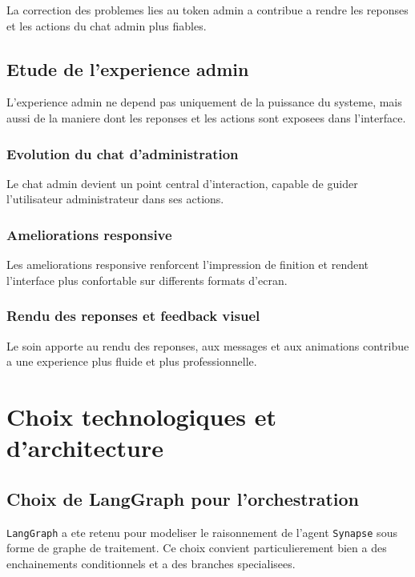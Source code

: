 La correction des problemes lies au token admin a contribue a rendre les reponses et les actions du chat admin plus fiables.

\subsection{Etude de l'experience admin}

L'experience admin ne depend pas uniquement de la puissance du systeme, mais aussi de la maniere dont les reponses et les actions sont exposees dans l'interface.

\subsubsection{Evolution du chat d'administration}

Le chat admin devient un point central d'interaction, capable de guider l'utilisateur administrateur dans ses actions.

\subsubsection{Ameliorations responsive}

Les ameliorations responsive renforcent l'impression de finition et rendent l'interface plus confortable sur differents formats d'ecran.

\subsubsection{Rendu des reponses et feedback visuel}

Le soin apporte au rendu des reponses, aux messages et aux animations contribue a une experience plus fluide et plus professionnelle.

\section{Choix technologiques et d'architecture}

\subsection{Choix de LangGraph pour l'orchestration}

\texttt{LangGraph} a ete retenu pour modeliser le raisonnement de l'agent \texttt{Synapse} sous forme de graphe de traitement. Ce choix convient particulierement bien a des enchainements conditionnels et a des branches specialisees.

